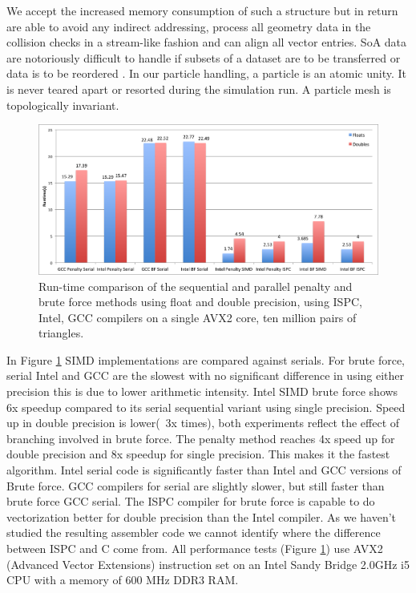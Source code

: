 \documentclass[times,12pt]{article}
\begin{document}
We accept the increased memory consumption of such a structure but in return are
able to avoid any indirect addressing, process all geometry data in the
collision checks in a stream-like fashion and can align all vector entries. 
SoA data are notoriously difficult to handle if subsets of a dataset are to be
transferred or data is to be reordered \cite{Eichenberger2004}.
In our particle handling, a particle is an atomic unity.
It is never teared apart or resorted during the simulation run.
A particle mesh is topologically invariant.


\begin{figure}[!h]
\centering
\includegraphics[width=1\textwidth]{perf} \protect\caption{\label{vecrun}Run-time comparison of the sequential and parallel penalty and brute force methods using float and double precision, using ISPC, Intel, GCC compilers on a single AVX2 core, ten million pairs of triangles.}
\end{figure} 

In Figure \ref{vecrun} SIMD implementations are compared against serials. For brute force, serial Intel and GCC are the slowest with no significant difference in using either precision this is due to lower arithmetic intensity. Intel SIMD  brute force shows 6x speedup compared to its serial sequential variant using single precision. Speed up in double precision is lower(~3x times), both experiments reflect the effect of branching involved in brute force. 
The penalty method reaches 4x speed up for double precision and 8x speedup for single precision. This makes it the fastest algorithm. Intel serial code is significantly faster than Intel and GCC versions of Brute force. GCC compilers for serial are slightly slower, but still faster than brute force GCC serial. The ISPC compiler for brute force is capable to do vectorization better for double precision than the Intel compiler. As we haven't studied the resulting assembler code we cannot identify where the difference between ISPC and C come from. All performance tests (Figure \ref{vecrun}) use AVX2 (Advanced Vector Extensions) instruction set on an Intel Sandy Bridge 2.0GHz i5 CPU with a memory of 600 MHz DDR3 RAM.
\end{document}
